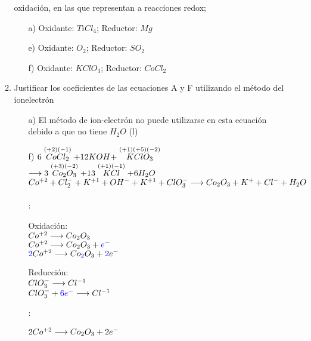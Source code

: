 \documentclass[../Práctica.root.tex]{subfiles}
\begin{document}
\begin{enumerate}
\begin{enumerate}
                    oxidación, en las que representan a reacciones redox;
                    \begin{enumerate}
                        \item[a)] Oxidante: $TiCl_4$; Reductor: $Mg$
                        \item[e)] Oxidante: $O_2$; Reductor: $SO_2$
                        \item[f)] Oxidante: $KClO_3$; Reductor: $CoCl_2$
                    \end{enumerate}
              \item Justificar los coeficientes de las ecuaciones A y F utilizando el método del ionelectrón
                    \begin{itemize}
                        \item[a)] El método de ion-electrón no puede utilizarse en esta ecuación debido a que no tiene $H_2O$ (l)
                        \item[f)] $6 \stackrel{(+2)(-1)}{CoCl_2} + 12 KOH + \stackrel{(+1)(+5)(-2)}{KClO_3}$
                              $\longrightarrow{} 3 \stackrel{(+3)(-2)}{Co_2O_3} + 13 \stackrel{(+1)(-1)}{KCl} + 6 H_2O$ \\
                              $Co^{+2} + Cl_2^- + K^{+1} + OH^- + K^{+1} + ClO_3^- \longrightarrow{} Co_2O_3 + K^+ + Cl^- + H_2O$ \\ \\
                              :
                              \begin{multicols}{2}
                                  Oxidación: \\
                                  $Co^{+2} \longrightarrow{} Co_2O_3$ \\
                                  $Co^{+2} \longrightarrow{} Co_2O_3 + \textcolor{blue}{e^-}$ \\
                                  $\textcolor{blue}{2} Co^{+2} \longrightarrow{} Co\textcolor{blue}{_2}O_3 + \textcolor{blue}{2}e^-$

                                  \columnbreak

                                  Reducción: \\
                                  $ClO_3^- \longrightarrow{} Cl^{-1}$ \\
                                  $ClO_3^- + \textcolor{blue}{6e^-} \longrightarrow{} Cl^{-1}$
                              \end{multicols}
                              :
                              \begin{multicols}{2}
                                  $2 Co^{+2} \longrightarrow{} Co_2O_3 + 2 e^-$


\end{multicols}
\end{itemize}
\end{enumerate}
\end{enumerate}
\end{document}
